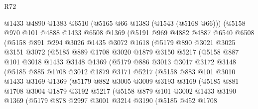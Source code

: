 \begin{lexlean}{R72}
\begin{coremodule}
        @1433
        @4890
        @1383
        @6510
        (@5165 @66 @1383 (@1543 (@5168 @66)))
        (@5158
          @970
          @101
          @4888
          @1433
          @6508
          @1369
          (@5191
            @969
            @4882
            @4887
            @6540
            @6508
            (@5158
              @891
              @294
              @3026
              @1435
              @3072
              @1618
              (@5179
                @890
                @3021
                @3025
                @3151
                @3072
                (@5185
                  @889
                  @1708
                  @3020
                  @1879
                  @3150
                  @5217
                  (@5158
                    @887
                    @101
                    @3018
                    @1433
                    @3148
                    @1369
                    (@5179
                      @886
                      @3013
                      @3017
                      @3172
                      @3148
                      (@5185
                        @885
                        @1708
                        @3012
                        @1879
                        @3171
                        @5217
                        (@5158
                          @883
                          @101
                          @3010
                          @1433
                          @3169
                          @1369
                          (@5179
                            @882
                            @3005
                            @3009
                            @3193
                            @3169
                            (@5185
                              @881
                              @1708
                              @3004
                              @1879
                              @3192
                              @5217
                              (@5158
                                @879
                                @101
                                @3002
                                @1433
                                @3190
                                @1369
                                (@5179
                                  @878
                                  @2997
                                  @3001
                                  @3214
                                  @3190
                                  (@5185
                                    @452
                                    @1708

\end{coremodule}
\end{lexlean}
